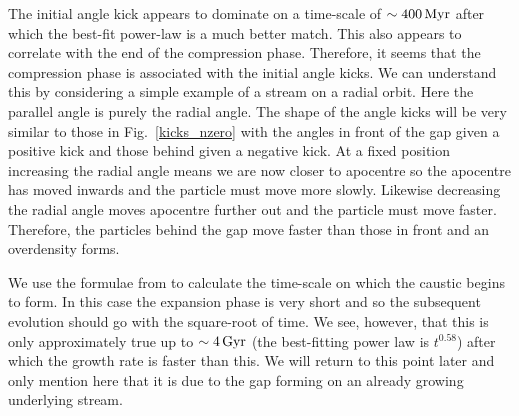 \documentclass[useAMS,usenatbib,fleqn,a4paper]{mn2e}
\def\Gyr{\,{\rm Gyr}}
\def\Myr{\,{\rm Myr}}
\begin{document}
The initial angle kick appears to dominate on a time-scale of $\sim400\Myr$ after which the best-fit power-law is a much better match. This also appears to correlate with the end of the compression phase. Therefore, it seems that the compression phase is associated with the initial angle kicks. We can understand this by considering a simple example of a stream on a radial orbit. Here the parallel angle is purely the radial angle. The shape of the angle kicks will be very similar to those in Fig.~\ref{kicks_nzero} with the angles in front of the gap given a positive kick and those behind given a negative kick. At a fixed position increasing the radial angle means we are now closer to apocentre so the apocentre has moved inwards and the particle must move more slowly. Likewise decreasing the radial angle moves apocentre further out and the particle must move faster. Therefore, the particles behind the gap move faster than those in front and an overdensity forms.

We use the formulae from \cite{ErkalBelokurov2015} to calculate the time-scale on which the caustic begins to form. In this case the expansion phase is very short and so the subsequent evolution should go with the square-root of time. We see, however, that this is only approximately true up to $\sim4\Gyr$ (the best-fitting power law is $t^{0.58}$) after which the growth rate is faster than this. We will return to this point later and only mention here that it is due to the gap forming on an already growing underlying stream.
\end{document}
